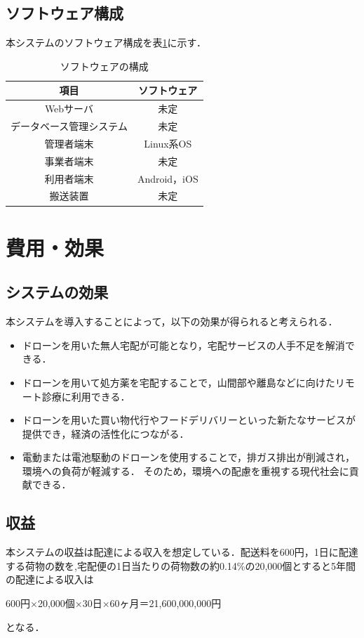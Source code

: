 \documentclass[a4paper, titlepage]{jsarticle}
\begin{document}
\subsection{ソフトウェア構成}
本システムのソフトウェア構成を表\ref{fig:software}に示す．
\begin{table}[H]
  \begin{center}
    \caption{ソフトウェアの構成}
    \label{fig:software}
    \begin{tabular}{cc} \hline
      項目 & ソフトウェア \\ \hline \hline
      Webサーバ & 未定 \\
      データベース管理システム & 未定 \\
      管理者端末 & Linux系OS \\
      事業者端末 & 未定 \\
      利用者端末 & Android，iOS \\
      搬送装置 & 未定 \\ \hline
    \end{tabular}
  \end{center}
\end{table}

\section{費用・効果}
\subsection{システムの効果}
本システムを導入することによって，以下の効果が得られると考えられる．
\begin{itemize}
\item ドローンを用いた無人宅配が可能となり，宅配サービスの人手不足を解消できる．
\item ドローンを用いて処方薬を宅配することで，山間部や離島などに向けたリモート診療に利用できる．
\item ドローンを用いた買い物代行やフードデリバリーといった新たなサービスが提供でき，経済の活性化につながる．
\item 電動または電池駆動のドローンを使用することで，排ガス排出が削減され，環境への負荷が軽減する．
  そのため，環境への配慮を重視する現代社会に貢献できる．
\end{itemize}

\subsection{収益}
本システムの収益は配達による収入を想定している．配送料を600円，1日に配達する荷物の数を,宅配便の1日当たりの荷物数の約0.14\%の20,000個とすると5年間の配達による収入は
\begin{center}
  600円×20,000個×30日×60ヶ月＝21,600,000,000円
\end{center}
となる．
\end{document}
